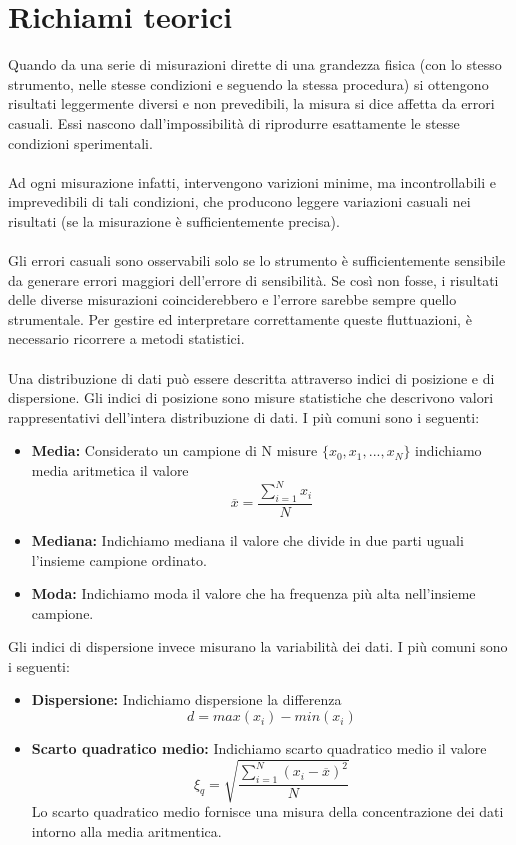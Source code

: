 \documentclass[11pt]{article}
\begin{document}
\section{Richiami teorici}
Quando da una serie di misurazioni dirette di una grandezza fisica (con lo stesso strumento, nelle stesse condizioni e seguendo la stessa procedura) si ottengono risultati leggermente diversi e non prevedibili, la misura si dice affetta da errori casuali. Essi nascono dall'impossibilità di riprodurre esattamente le stesse condizioni sperimentali. \\ \\ Ad ogni misurazione infatti, intervengono varizioni minime, ma incontrollabili e imprevedibili di tali condizioni, che producono leggere variazioni casuali nei risultati (se la misurazione è sufficientemente precisa). \\ \\ Gli errori casuali sono osservabili solo se lo strumento è sufficientemente sensibile da generare errori maggiori dell'errore di sensibilità. Se così non fosse, i risultati delle diverse misurazioni coinciderebbero e l'errore sarebbe sempre quello strumentale. Per gestire ed interpretare correttamente queste fluttuazioni, è necessario ricorrere a metodi statistici.
\\ \\
Una distribuzione di dati può essere descritta attraverso indici di posizione e di dispersione. Gli indici di posizione sono misure statistiche che descrivono valori rappresentativi dell'intera distribuzione di dati. I più comuni sono i seguenti:
\begin{itemize}
    \item \textbf{Media:} Considerato un campione di N misure $\{x_0, x_1, ..., x_N\}$ indichiamo media aritmetica il valore $$\overline{x}=\frac{\displaystyle\sum_{i=1}^{N}x_i}{N}$$
    \item \textbf{Mediana:} Indichiamo mediana il valore che divide in due parti uguali l'insieme campione ordinato.
    \item \textbf{Moda:} Indichiamo moda il valore che ha frequenza più alta nell'insieme campione.
\end{itemize}
Gli indici di dispersione invece misurano la variabilità dei dati. I più comuni sono i seguenti:
\begin{itemize}
    \item \textbf{Dispersione:} Indichiamo dispersione la differenza $$d=max(x_i) - min(x_i)$$
    \item \textbf{Scarto quadratico medio:} Indichiamo scarto quadratico medio il valore $$\xi_q=\sqrt{\frac{\displaystyle\sum_{i=1}^{N}(x_i - \overline{x})^2}{N}}$$ Lo scarto quadratico medio fornisce una misura della concentrazione dei dati intorno alla media aritmentica.
\end{itemize}
\end{document}
